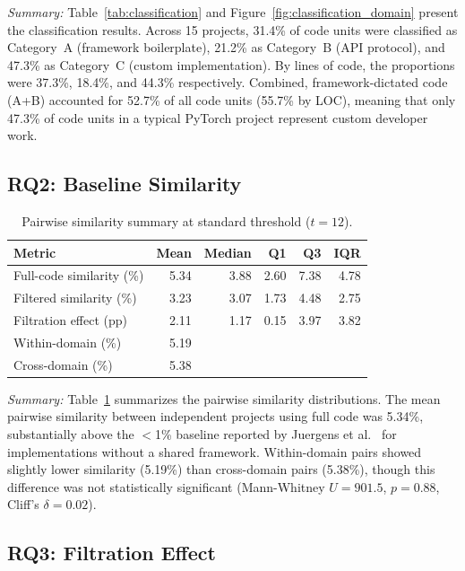 \documentclass[smallextended,natbib]{svjour3}
\begin{document}
\emph{Summary:} Table~\ref{tab:classification} and Figure~\ref{fig:classification_domain} present the classification results. Across 15 projects, 31.4\% of code units were classified as Category~A (framework boilerplate), 21.2\% as Category~B (API protocol), and 47.3\% as Category~C (custom implementation). By lines of code, the proportions were 37.3\%, 18.4\%, and 44.3\% respectively. Combined, framework-dictated code (A+B) accounted for 52.7\% of all code units (55.7\% by LOC), meaning that only 47.3\% of code units in a typical PyTorch project represent custom developer work.

\subsection{RQ2: Baseline Similarity}

\begin{table}[t]
\centering
\caption{Pairwise similarity summary at standard threshold ($t=12$).}
\label{tab:similarity}
\small
\begin{tabular}{lrrrrr}
\toprule
Metric & Mean & Median & Q1 & Q3 & IQR \\
\midrule
Full-code similarity (\%) & 5.34 & 3.88 & 2.60 & 7.38 & 4.78 \\
Filtered similarity (\%) & 3.23 & 3.07 & 1.73 & 4.48 & 2.75 \\
Filtration effect (pp) & 2.11 & 1.17 & 0.15 & 3.97 & 3.82 \\
\midrule
Within-domain (\%) & 5.19 & & & & \\
Cross-domain (\%) & 5.38 & & & & \\
\bottomrule
\end{tabular}
\end{table}

\emph{Summary:} Table~\ref{tab:similarity} summarizes the pairwise similarity distributions. The mean pairwise similarity between independent projects using full code was 5.34\%, substantially above the $<$1\% baseline reported by Juergens et al.~\citep{juergens2010} for implementations without a shared framework. Within-domain pairs showed slightly lower similarity (5.19\%) than cross-domain pairs (5.38\%), though this difference was not statistically significant (Mann-Whitney $U = 901.5$, $p = 0.88$, Cliff's $\delta = 0.02$).

\subsection{RQ3: Filtration Effect}
\end{document}
